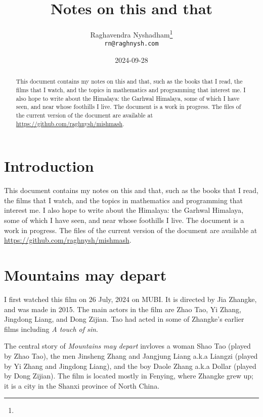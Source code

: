 \documentclass{article}
\title{Notes on this and that}
\author{Raghavendra Nyshadham\thanks{\cczero} \\
  {\normalsize\nolinkurl{rn@raghnysh.com}}}
\date{2024-09-28}
\begin{document}
\begin{titlingpage}
  \maketitle

  \begin{abstract}
    This document contains my notes on this and that, such as the
    books that I read, the films that I watch, and the topics in
    mathematics and programming that interest me.  I also hope to
    write about the Himalaya: the Garhwal Himalaya, some of which I
    have seen, and near whose foothills I live.  The document is a
    work in progress.  The files of the current version of the
    document are available at
    \url{https://github.com/raghnysh/mishmash}.

  \end{abstract}
\end{titlingpage}

\tableofcontents

\section{Introduction}
\label{sec:113nrd0o}

This document contains my notes on this and that, such as the books
that I read, the films that I watch, and the topics in mathematics and
programming that interest me.  I also hope to write about the
Himalaya: the Garhwal Himalaya, some of which I have seen, and near
whose foothills I live.  The document is a work in progress.  The
files of the current version of the document are available at
\url{https://github.com/raghnysh/mishmash}.

\section{Mountains may depart}
\label{sec:ov8yna0s}

I first watched this film on 26 July, 2024 on MUBI.  It is directed by
Jia Zhangke, and was made in 2015.  The main actors in the film are
Zhao Tao, Yi Zhang, Jingdong Liang, and Dong Zijian.  Tao had acted in
some of Zhangke's earlier films including \emph{A touch of sin}.

The central story of \emph{Mountains may depart} invloves a woman Shao
Tao (played by Zhao Tao), the men Jinsheng Zhang and Jangjung Liang
a.k.a Liangzi (played by Yi Zhang and Jingdong Liang), and the boy
Daole Zhang a.k.a Dollar (played by Dong Zijian).  The film is located
mostly in Fenying, where Zhangke grew up; it is a city in the Shanxi
province of North China.
\end{document}
